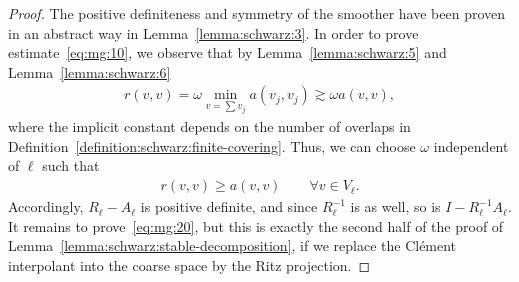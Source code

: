 \begin{proof}
  The positive definiteness and symmetry of the smoother have been
  proven in an abstract way in Lemma~\ref{lemma:schwarz:3}. In order
  to prove estimate~\eqref{eq:mg:10}, we observe that by
  Lemma~\ref{lemma:schwarz:5} and Lemma~\ref{lemma:schwarz:6}
  \begin{gather*}
    r(v,v) = \omega \min_{v=\sum v_j} a(v_j, v_j) \gtrsim \omega a(v,v),
  \end{gather*}
  where the implicit constant depends on the number of overlaps in
  Definition~\ref{definition:schwarz:finite-covering}. Thus, we can
  choose $\omega$ independent of $\ell$ such that
  \begin{gather*}
    r(v,v) \ge a(v,v) \qquad \forall v\in V_\ell.
  \end{gather*}
  Accordingly, $R_\ell - A_\ell$ is positive definite, and since
  $R_\ell^{-1}$ is as well, so is $I-R_\ell^{-1} A_\ell$.
  It remains to prove~\eqref{eq:mg:20}, but this is exactly the second
  half of the proof of Lemma~\ref{lemma:schwarz:stable-decomposition},
  if we replace the Clément interpolant into the coarse space by the
  Ritz projection.
\end{proof}



